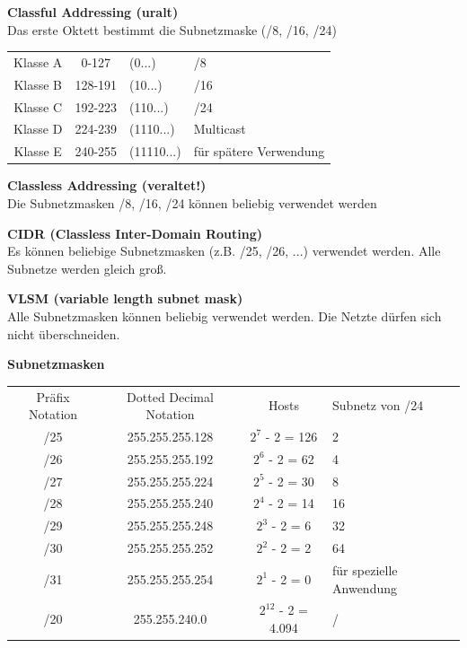 \textbf{Classful Addressing (uralt)} \\
Das erste Oktett bestimmt die Subnetzmaske (/8, /16, /24)
\begin{table}[H]
	\begin{tabular}{ccll}
		Klasse A & 0-127 & (0...) & /8 \\
		Klasse B & 128-191 & (10...) & /16 \\
		Klasse C & 192-223 & (110...) & /24 \\
		Klasse D & 224-239 & (1110...) & Multicast \\
		Klasse E & 240-255 & (11110...) & für spätere Verwendung
	\end{tabular}
\end{table}

\textbf{Classless Addressing (veraltet!)} \\
Die Subnetzmasken /8, /16, /24 können beliebig verwendet werden

\textbf{CIDR (Classless Inter-Domain Routing)} \\
Es können beliebige Subnetzmasken (z.B. /25, /26, ...) verwendet werden. Alle Subnetze werden gleich groß.

\textbf{VLSM (variable length subnet mask)} \\
Alle Subnetzmasken können beliebig verwendet werden. Die Netzte dürfen sich nicht überschneiden.

\textbf{Subnetzmasken}
\begin{table}[H]
	\begin{tabular}{cccl}
		Präfix Notation & Dotted Decimal Notation & Hosts & Subnetz von /24 \\
		/25 & 255.255.255.128 & $2^{7}$ - 2 = 126 & 2 \\
		/26 & 255.255.255.192 & $2^{6}$ - 2 = 62 & 4 \\
		/27 & 255.255.255.224 & $2^{5}$ - 2 = 30 & 8 \\
		/28 & 255.255.255.240 & $2^{4}$ - 2 = 14 & 16 \\
		/29 & 255.255.255.248 & $2^{3}$ - 2 = 6 & 32 \\
		/30 & 255.255.255.252 & $2^{2}$ - 2 = 2 & 64 \\
		/31 & 255.255.255.254 & $2^{1}$ - 2 = 0 & für spezielle Anwendung \\
		/20 & 255.255.240.0 & $2^{12}$ - 2 = 4.094 & /
	\end{tabular}
\end{table}

